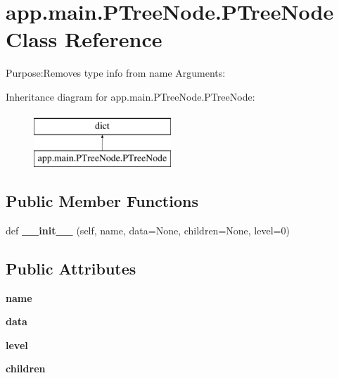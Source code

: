 \hypertarget{classapp_1_1main_1_1PTreeNode_1_1PTreeNode}{}\section{app.\+main.\+P\+Tree\+Node.\+P\+Tree\+Node Class Reference}
\label{classapp_1_1main_1_1PTreeNode_1_1PTreeNode}


Purpose\+:Removes type info from name Arguments\+:  


Inheritance diagram for app.\+main.\+P\+Tree\+Node.\+P\+Tree\+Node\+:\begin{figure}[H]
\begin{center}
\leavevmode
\includegraphics[height=2.000000cm]{classapp_1_1main_1_1PTreeNode_1_1PTreeNode}
\end{center}
\end{figure}
\subsection*{Public Member Functions}
\begin{DoxyCompactItemize}
\item 
\mbox{\label{classapp_1_1main_1_1PTreeNode_1_1PTreeNode_abc830ac4a1b236b6a9261b2be3791e4b}} 
def {\bfseries \+\_\+\+\_\+init\+\_\+\+\_\+} (self, name, data=None, children=None, level=0)
\end{DoxyCompactItemize}
\subsection*{Public Attributes}
\begin{DoxyCompactItemize}
\item 
\mbox{\label{classapp_1_1main_1_1PTreeNode_1_1PTreeNode_a5ae43a019e73e42ab9a5047068e66bbc}} 
{\bfseries name}
\item 
\mbox{\label{classapp_1_1main_1_1PTreeNode_1_1PTreeNode_aac95bd54ab7f958f75c63a66c806b1e9}} 
{\bfseries data}
\item 
\mbox{\label{classapp_1_1main_1_1PTreeNode_1_1PTreeNode_aae5eebe01363b149d66215e1646be328}} 
{\bfseries level}
\item 
\mbox{\label{classapp_1_1main_1_1PTreeNode_1_1PTreeNode_aba88e135fef7abf9cf91ae4dc16d5c9d}} 
{\bfseries children}
\end{DoxyCompactItemize}


